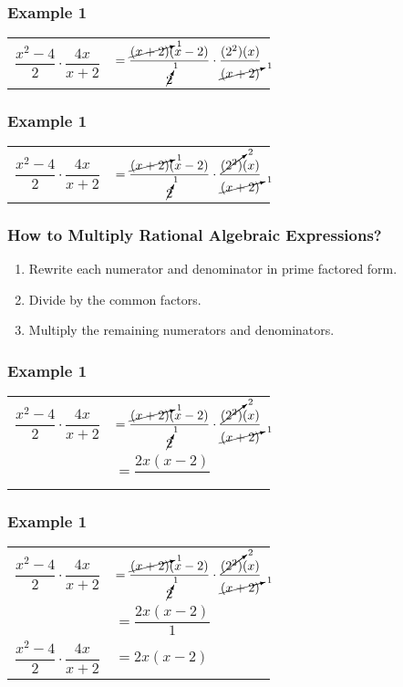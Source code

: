 \documentclass[14pt]{beamer}
\begin{document}
    \begin{frame}
    	\frametitle{Example 1}
    	\begin{tabular}{ll}
    		$\dfrac{x^2 - 4}{2} \cdot \dfrac{4x}{x + 2}$ & $ = \dfrac{\cancelto{1}{(x  + 2 )} ( x  -  2)}{\cancelto{1}{2}} \cdot \dfrac{(2^2)(x)}{\cancelto{1}{(x  + 2 )}}$ \\
    	\end{tabular}
    \end{frame}


    \begin{frame}
  	\frametitle{Example 1}
  	\begin{tabular}{ll}
  		$\dfrac{x^2 - 4}{2} \cdot \dfrac{4x}{x + 2}$ & $ = \dfrac{\cancelto{1}{(x  + 2 )} ( x  -  2)}{\cancelto{1}{2}} \cdot \dfrac{\cancelto{2}{(2^2)}(x)}{\cancelto{1}{(x  + 2 )}}$ \\
  	\end{tabular}
  \end{frame}

    \begin{frame}
    	\frametitle{How to Multiply Rational Algebraic Expressions?}
    	\begin{enumerate}
    		\item Rewrite each numerator and denominator in prime factored form.
    		\item Divide by the common factors.
    		\item Multiply the remaining numerators and denominators.
    	\end{enumerate}
    \end{frame}

    \begin{frame}
    	\frametitle{Example 1}
    	\begin{tabular}{ll}
    		$\dfrac{x^2 - 4}{2} \cdot \dfrac{4x}{x + 2}$ & $ = \dfrac{\cancelto{1}{(x  + 2 )} ( x  -  2)}{\cancelto{1}{2}} \cdot \dfrac{\cancelto{2}{(2^2)}(x)}{\cancelto{1}{(x  + 2 )}}$ \\[2em]
    		&  \pause $= \dfrac{2x (x - 2)}{} $ \\
    	\end{tabular}
    \end{frame}

    \begin{frame}
    	\frametitle{Example 1}
    	\begin{tabular}{ll}
    		$\dfrac{x^2 - 4}{2} \cdot \dfrac{4x}{x + 2}$ & $ = \dfrac{\cancelto{1}{(x  + 2 )} ( x  -  2)}{\cancelto{1}{2}} \cdot \dfrac{\cancelto{2}{(2^2)}(x)}{\cancelto{1}{(x  + 2 )}}$ \\[2em]
    		   &  $= \dfrac{2x (x - 2)}{1} $ \\[2em]
    	\pause	$\dfrac{x^2 - 4}{2} \cdot \dfrac{4x}{x + 2}$   &  $ = 2x(x - 2) $
    	\end{tabular}
    \end{frame}
\end{document}
